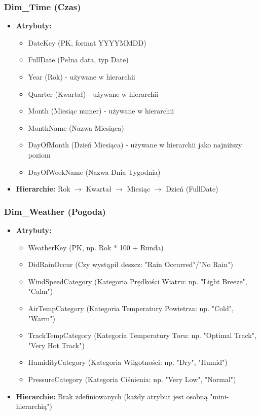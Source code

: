 \documentclass[a4paper,12pt]{article}
\begin{document}
\subsubsection{Dim\_Time (Czas)}
\begin{itemize}
  \item \textbf{Atrybuty:}
        \begin{itemize}
          \item DateKey (PK, format YYYYMMDD)
          \item FullDate (Pełna data, typ Date)
          \item Year (Rok) - używane w hierarchii
          \item Quarter (Kwartał) - używane w hierarchii
          \item Month (Miesiąc numer) - używane w hierarchii
          \item MonthName (Nazwa Miesiąca)
          \item DayOfMonth (Dzień Miesiąca) - używane w hierarchii jako najniższy poziom
          \item DayOfWeekName (Nazwa Dnia Tygodnia)
        \end{itemize}
  \item \textbf{Hierarchie:} Rok $\rightarrow$ Kwartał $\rightarrow$ Miesiąc $\rightarrow$ Dzień (FullDate)
\end{itemize}

\subsubsection{Dim\_Weather (Pogoda)}
\begin{itemize}
  \item \textbf{Atrybuty:}
        \begin{itemize}
          \item WeatherKey (PK, np. Rok * 100 + Runda)
          \item DidRainOccur (Czy wystąpił deszcz: "Rain Occurred"/"No Rain")
          \item WindSpeedCategory (Kategoria Prędkości Wiatru: np. "Light Breeze", "Calm")
          \item AirTempCategory (Kategoria Temperatury Powietrza: np. "Cold", "Warm")
          \item TrackTempCategory (Kategoria Temperatury Toru: np. "Optimal Track", "Very Hot Track")
          \item HumidityCategory (Kategoria Wilgotności: np. "Dry", "Humid")
          \item PressureCategory (Kategoria Ciśnienia: np. "Very Low", "Normal")
        \end{itemize}
  \item \textbf{Hierarchie:} Brak zdefiniowanych (każdy atrybut jest osobną "mini-hierarchią")
\end{itemize}
\end{document}
